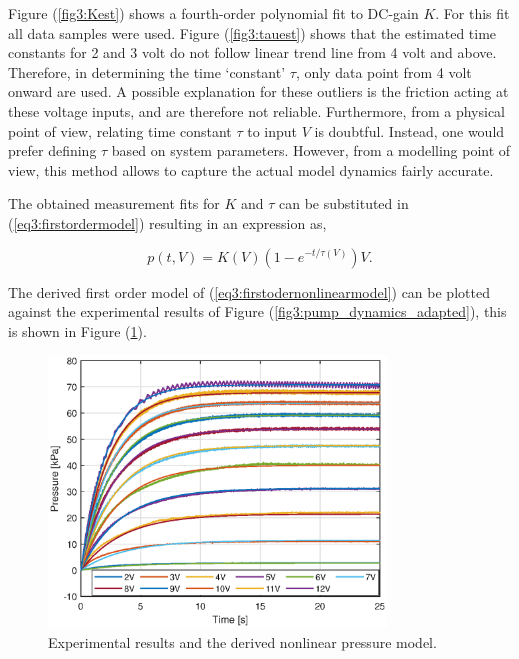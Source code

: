 Figure (\ref{fig3:Kest}) shows a fourth-order polynomial fit to DC-gain $K$. For this fit all data samples were used. Figure (\ref{fig3:tauest}) shows that the estimated time constants for 2 and 3 volt do not follow linear trend line from 4 volt and above. Therefore, in determining the time `constant' $\tau$, only data point from 4 volt onward are used. A possible explanation for these outliers is the friction acting at these voltage inputs, and are therefore not reliable. Furthermore, from a physical point of view, relating time constant $\tau$ to input $V$ is doubtful. Instead, one would prefer defining $\tau$ based on system parameters. However, from a modelling point of view, this method allows to capture the actual model dynamics fairly accurate.

The obtained measurement fits for $K$ and $\tau$ can be substituted in (\ref{eq3:firstordermodel}) resulting in an expression as,

\begin{equation}
    p(t,V) = K(V)(1-e^{-t/\tau(V)})V.
    \label{eq3:firstodernonlinearmodel}
    \end{equation}

The derived first order model of (\ref{eq3:firstodernonlinearmodel}) can be plotted against the experimental results of Figure (\ref{fig3:pump_dynamics_adapted}), this is shown in Figure (\ref{fig3:expvsfitpres}).

\begin{figure}[H]
    \centering
    \includegraphics[width = 0.8\textwidth]{Figures/Chapter3/expfit.eps}
    \caption{Experimental results and the derived nonlinear pressure model.}
    \label{fig3:expvsfitpres}
\end{figure}


